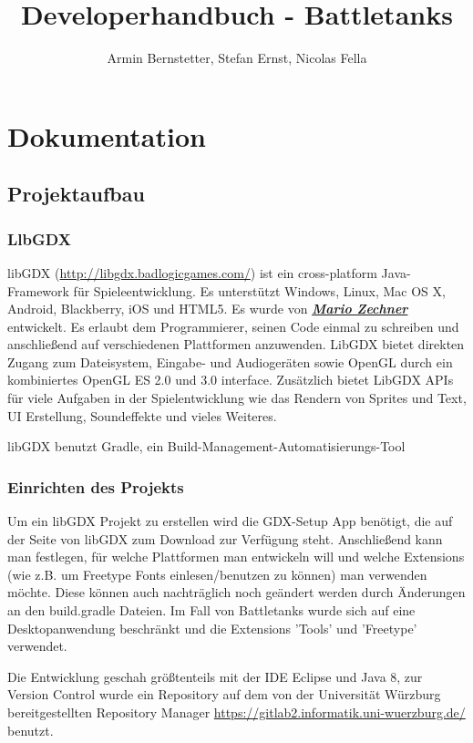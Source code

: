 \documentclass[10pt]{report}
\title{Developerhandbuch - Battletanks}
\author{Armin Bernstetter, Stefan Ernst, Nicolas Fella}
\begin{document}
\maketitle
\tableofcontents
\newpage



\chapter{Dokumentation}
\section{Projektaufbau}
\subsection{LlbGDX}
libGDX (\url{http://libgdx.badlogicgames.com/}) ist ein cross-platform Java-Framework für Spieleentwicklung. Es unterstützt Windows, Linux, Mac OS X, Android, Blackberry, iOS und HTML5.
Es wurde von \href{https://twitter.com/badlogicgames}{\textbf{\textit{Mario Zechner}}} entwickelt.
Es erlaubt dem Programmierer, seinen Code einmal zu schreiben und anschließend auf verschiedenen Plattformen anzuwenden.
LibGDX bietet direkten Zugang zum Dateisystem, Eingabe- und Audiogeräten sowie OpenGL durch ein kombiniertes OpenGL ES 2.0 und 3.0 interface.
Zusätzlich bietet LibGDX APIs für viele Aufgaben in der Spielentwicklung wie das Rendern von Sprites und Text, UI Erstellung, Soundeffekte und vieles Weiteres.

libGDX benutzt Gradle, ein Build-Management-Automatisierungs-Tool


\subsection{Einrichten des Projekts}
Um ein libGDX Projekt zu erstellen wird die GDX-Setup App benötigt, die auf der Seite von libGDX zum Download zur Verfügung steht. Anschließend kann man festlegen, für welche Plattformen man entwickeln will und welche Extensions (wie z.B. um Freetype Fonts einlesen/benutzen zu können) man verwenden möchte. Diese können auch nachträglich noch geändert werden durch Änderungen an den build.gradle Dateien.
Im Fall von Battletanks wurde sich auf eine Desktopanwendung beschränkt und die Extensions 'Tools' und 'Freetype' verwendet.

Die Entwicklung geschah größtenteils mit der IDE Eclipse und Java 8, zur Version Control wurde ein Repository auf dem von der Universität Würzburg bereitgestellten Repository Manager \url{https://gitlab2.informatik.uni-wuerzburg.de/} benutzt.
\end{document}
